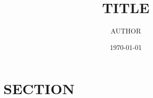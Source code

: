 \documentclass[12pt,a4paper]{article}
\title{TITLE}
\author{AUTHOR}
\date{\today}
\begin{document}
\maketitle

\section{SECTION}

%
\end{document}
